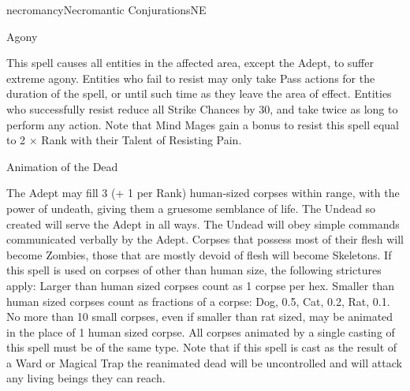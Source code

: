 \begin{College}[1.1]{necromancy}{Necromantic Conjurations}{NE}
\begin{spell}[S-1]{Agony}
\begin{effects}
This spell causes all entities in the affected area, except the Adept,
to suffer extreme agony.  Entities who fail to resist may only take
Pass actions for the duration of the spell, or until such time as they
leave the area of effect.  Entities who successfully resist reduce all
Strike Chances by 30, and take twice as long to perform any action.
Note that Mind Mages gain a bonus to resist this spell equal to 2 ×
Rank with their Talent of Resisting Pain.
\end{effects}
\end{spell}

\begin{spell}[S-2]{Animation of the Dead}
\begin{effects}
The Adept may fill 3 (+ 1 per Rank) human-sized corpses within range,
with the power of undeath, giving them a gruesome semblance of
life. The Undead so created will serve the Adept in all ways. The
Undead will obey simple commands communicated verbally by the
Adept. Corpses that possess most of their flesh will become Zombies,
those that are mostly devoid of flesh will become Skeletons.  If this
spell is used on corpses of other than human size, the following
strictures apply: Larger than human sized corpses count as 1 corpse
per hex. Smaller than human sized corpses count as fractions of a
corpse: Dog, 0.5, Cat, 0.2, Rat, 0.1.  No more than 10 small corpses,
even if smaller than rat sized, may be animated in the place of 1
human sized corpse.  All corpses animated by a single casting of this
spell must be of the same type. Note that if this spell is cast as the
result of a Ward or Magical Trap the reanimated dead will be
uncontrolled and will attack any living beings they can reach.
\end{effects}
\end{spell}


\end{College}
